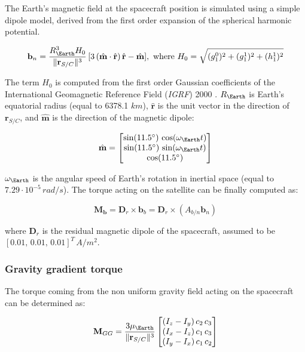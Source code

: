 The Earth's magnetic field at the spacecraft position is simulated using a simple dipole model, derived from the first order expansion of the spherical harmonic potential.

\begin{equation}
    \mathbf{b}_n = \frac{R_{\Earth}^3 H_0}{\| \mathbf{r}_{S/C} \|^3}\,[3\,(\hat{\mathbf{m}} \cdot \hat{\mathbf{r}}) \, \hat{\mathbf{r}} - \hat{\mathbf{m}}], \text{ where } H_0 = \sqrt{(g_1^0)^2 + (g_1^1)^2 + (h_1^1)^2}
\end{equation}

The term $H_0$ is computed from the first order Gaussian coefficients of the International Geomagnetic Reference Field (\textit{IGRF}) 2000 \cite{igrf}. $R_{\Earth}$ is Earth's equatorial radius (equal to 6378.1 $km$), $\hat{\mathbf{r}}$ is the unit vector in the direction of $\mathbf{r}_{S/C}$, and $\hat{\mathbf{m}}$ is the direction of the magnetic dipole:

\begin{equation}
    \hat{\mathbf{m}} = \begin{bmatrix}
    \sin (11.5^{\circ})\, \cos (\omega_{\Earth} t) \\
    \sin (11.5^{\circ})\, \sin (\omega_{\Earth} t) \\
    \cos (11.5^{\circ})
    \end{bmatrix}
\end{equation}

$\omega_{\Earth}$ is the angular speed of Earth's rotation in inertial space (equal to $7.29 \cdot 10^{-5}\, rad/s$). The torque acting on the satellite can be finally computed as:

\begin{equation}
    \mathbf{M}_{\mathbf{b}} = \mathbf{D}_r \times \mathbf{b}_b = \mathbf{D}_r \times (A_{b/n} \mathbf{b}_n )
\end{equation}

where $\mathbf{D}_r$ is the residual magnetic dipole of the spacecraft, assumed to be $[0.01, \, 0.01, \, 0.01]^T \, A/m^2$.

\subsubsection{Gravity gradient torque}

The torque coming from the non uniform gravity field acting on the spacecraft can be determined as:

\begin{equation}
    \mathbf{M}_{GG} = \frac{3 \mu_{\Earth}}{\| \mathbf{r}_{S/C} \|^3} \begin{bmatrix}
    (I_z - I_y)\, c_2\,c_3 \\
    (I_x - I_z)\, c_1\,c_3 \\
    (I_y - I_x)\, c_1\,c_2
    \end{bmatrix}
    \label{eq:gravity-gradient}
\end{equation}

